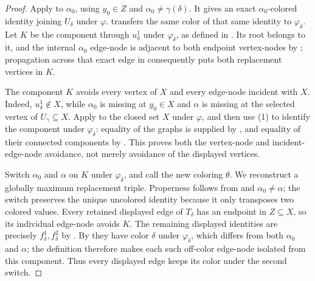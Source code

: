 \begin{proof}
Apply  to $\alpha_0$, using
$y_0\in Z$ and $\alpha_0\ne\gamma(\delta)$.  It gives an exact
$\alpha_0$-colored identity joining $U_\delta$ under $\varphi$.
 transfers the same color of that same
identity to $\varphi_\delta$.  Let $K$ be the component through
$u^1_\delta$ under $\varphi_\delta$, as defined in
.  Its root belongs to it, and the internal
$\alpha_0$ edge-node is adjacent to both endpoint vertex-nodes by
; propagation across that exact edge in
 consequently puts both replacement vertices in
$K$.

The component $K$ avoids every vertex of $X$ and every edge-node incident
with $X$.  Indeed, $u^1_\delta\notin X$, while $\alpha_0$ is missing at
$y_0\in X$ and $\alpha$ is missing at the selected vertex of
$U_\gamma\subseteq X$.  Apply
 to the closed set $X$ under
$\varphi$, and then use (1) to identify the component under
$\varphi_\delta$: equality of the graphs is supplied by
, and equality of their connected
components by .  This proves both the vertex-node
and incident-edge-node avoidance, not merely avoidance of the displayed
vertices.

Switch $\alpha_0$ and $\alpha$ on $K$ under $\varphi_\delta$, and call the
new coloring $\theta$.  We reconstruct a globally maximum replacement
triple.  Properness follows from  and
$\alpha_0\ne\alpha$; the switch preserves the unique uncolored identity
because it only transposes two colored values.  Every retained displayed
edge of $T_\delta$ has an endpoint in $Z\subseteq X$, so its individual
edge-node avoids $K$.  The remaining displayed identities are precisely
$f^1_\delta,f^2_\delta$ by .  By
 they have color $\delta$ under
$\varphi_\delta$, which differs from both $\alpha_0$ and $\alpha$; the
definition  therefore makes each such
off-color edge-node isolated from this component.  Thus every displayed
edge keeps its color under the second switch.


\end{proof}
